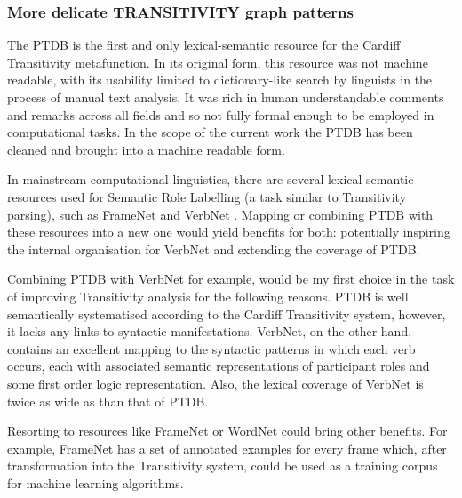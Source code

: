 \subsubsection{More delicate TRANSITIVITY graph patterns}

    The PTDB \citep{Neale2002} is the first and only lexical-semantic resource for the Cardiff Transitivity metafunction. In its original form, this resource was not machine readable, with its usability limited to dictionary-like search by linguists in the process of manual text analysis. It was rich in human understandable comments and remarks across all fields and so not fully formal enough to be employed in computational tasks. In the scope of the current work the PTDB has been cleaned and brought into a machine readable form. %

    In mainstream computational linguistics, there are several lexical-semantic resources used for Semantic Role Labelling (a task similar to Transitivity parsing), such as FrameNet \citep{Baker1998} and VerbNet \citep{Kipper2008}. Mapping or combining PTDB with these resources into a new one would yield benefits for both: potentially inspiring the internal organisation for VerbNet and extending the coverage of PTDB.

    Combining PTDB with VerbNet for example, would be my first choice in the task of improving Transitivity analysis for the following reasons. PTDB is well semantically systematised according to the Cardiff Transitivity system, however, it lacks any links to syntactic manifestations. VerbNet, on the other hand, contains an excellent mapping to the syntactic patterns in which each verb occurs, each with associated semantic representations of participant roles and some first order logic representation. %
    Also, the lexical coverage of VerbNet is twice as wide as than that of PTDB. 

    Resorting to resources like FrameNet or WordNet could bring other benefits. For example, FrameNet has a set of annotated examples for every frame which, after transformation into the Transitivity system, could be used as a training corpus for machine learning algorithms. 
    

